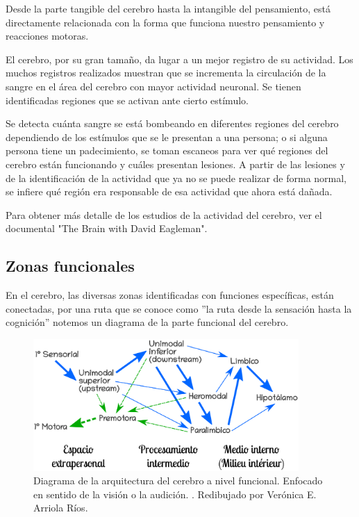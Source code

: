 Desde la parte tangible del cerebro hasta la intangible del pensamiento, está directamente relacionada con la forma que funciona nuestro pensamiento y reacciones motoras.


El cerebro, por su gran tamaño, da lugar a un mejor registro de su actividad. Los muchos registros realizados muestran que se incrementa la circulación de la sangre en el área del cerebro con mayor actividad neuronal. Se tienen identificadas regiones que se activan ante cierto estímulo. \parencite{neurona_A_cerebro}


 Se detecta cuánta sangre se está bombeando en diferentes regiones del cerebro dependiendo de los estímulos que se le presentan a una persona; o si alguna persona tiene un padecimiento, se toman escaneos para ver qué regiones del cerebro están funcionando y cuáles presentan lesiones. A partir de las lesiones y de la identificación de la actividad que ya no se puede realizar de forma normal, se infiere qué región era responsable de esa actividad que ahora está dañada.\parencite{estudiosF}

Para obtener más detalle de los estudios de la actividad del cerebro, ver el documental "The Brain with David Eagleman".

\subsection{Zonas funcionales}

En el cerebro, las diversas zonas identificadas con funciones específicas, están conectadas, por una ruta que se conoce como 
 ''la ruta desde la sensación hasta la cognición'' notemos un diagrama de la parte funcional del cerebro. \parencite{sensAcogn}
 


 \begin{figure}[h]
  \centering
  \includegraphics[width=0.9\textwidth]{../Figuras/zonasFuncionales.png}
  \caption{Diagrama de la arquitectura del cerebro a nivel funcional. Enfocado en sentido de la visión o la audición. \parencite{Mesulam1998}. Redibujado por Verónica E. Arriola Ríos. }
  \label{fig:zonasFun}
 \end{figure}

